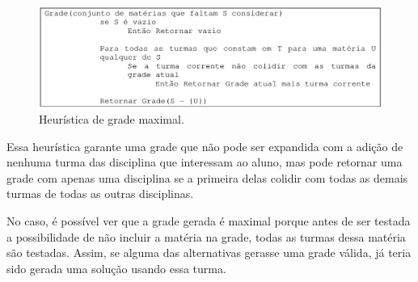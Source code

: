 \documentclass[graduacao,brazil]{ThesisPUC}
\begin{document}
\begin{figure}[H]
    \centering
    \includegraphics[width=\linewidth]{img/algoritmo_grade_maximal.png}
    \caption{Heurística de grade maximal.}
\end{figure}

Essa heurística garante uma grade que não pode ser expandida com a adição de nenhuma turma das disciplina que interessam ao aluno, mas pode retornar uma grade com apenas uma disciplina se a primeira delas colidir com todas as demais turmas de todas as outras disciplinas.

No caso, é possível ver que a grade gerada é maximal porque antes de ser testada a possibilidade de não incluir a matéria na grade, todas as turmas dessa matéria são testadas. Assim, se alguma das alternativas gerasse uma grade válida, já teria sido gerada uma solução usando essa turma.
\end{document}

